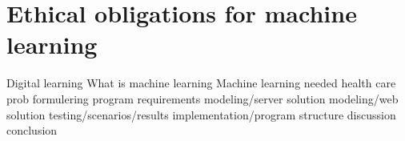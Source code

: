 \section{Ethical obligations for machine learning}\label{sec:ethical_obligations}


Digital learning
What is machine learning
Machine learning needed health care 
prob formulering
program requirements
modeling/server solution
modeling/web solution
testing/scenarios/results
implementation/program structure
discussion
conclusion